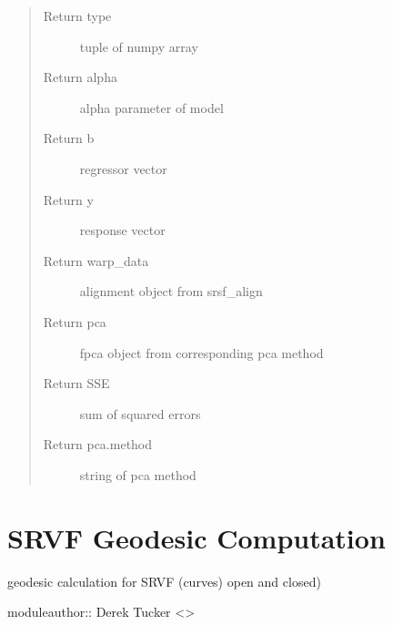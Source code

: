 \documentclass[letterpaper,10pt,english]{sphinxmanual}
\begin{document}
\begin{fulllineitems}
\begin{quote}
\begin{description}
\begin{itemize}
\end{itemize}

\item[{Return type}] \leavevmode
tuple of numpy array

\item[{Return alpha}] \leavevmode
alpha parameter of model

\item[{Return b}] \leavevmode
regressor vector

\item[{Return y}] \leavevmode
response vector

\item[{Return warp\_data}] \leavevmode
alignment object from srsf\_align

\item[{Return pca}] \leavevmode
fpca object from corresponding pca method

\item[{Return SSE}] \leavevmode
sum of squared errors

\item[{Return pca.method}] \leavevmode
string of pca method

\end{description}\end{quote}

\end{fulllineitems}



\chapter{SRVF Geodesic Computation}
\label{\detokenize{geodesic:module-geodesic}}\label{\detokenize{geodesic:srvf-geodesic-computation}}\label{\detokenize{geodesic::doc}}
geodesic calculation for SRVF (curves) open and closed)

moduleauthor:: Derek Tucker \textless{}\textgreater{}
\end{document}
